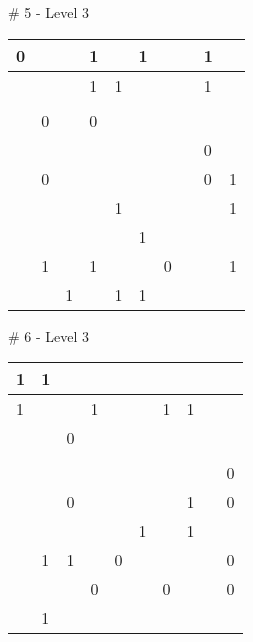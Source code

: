 \medskip

\# 5 - Level 3 \newline
\begin{tabular}{|m{\collen}|m{\collen}|m{\collen}|m{\collen}|m{\collen}|m{\collen}|m{\collen}|m{\collen}|m{\collen}|m{\collen}|}
\hline
  0 &   &   & 1 &   & 1 &   &   & 1 &   \\
\hline
    &   &   & 1 & 1 &   &   &   & 1 &   \\
\hline
    &   &   &   &   &   &   &   &   &   \\
\hline
    & 0 &   & 0 &   &   &   &   &   &   \\
\hline
    &   &   &   &   &   &   &   & 0 &   \\
\hline
    & 0 &   &   &   &   &   &   & 0 & 1 \\
\hline
    &   &   &   & 1 &   &   &   &   & 1 \\
\hline
    &   &   &   &   & 1 &   &   &   &   \\
\hline
    & 1 &   & 1 &   &   & 0 &   &   & 1 \\
\hline
    &   & 1 &   & 1 & 1 &   &   &   &   \\
\hline
\end{tabular}


\medskip

\# 6 - Level 3 \newline
\begin{tabular}{|m{\collen}|m{\collen}|m{\collen}|m{\collen}|m{\collen}|m{\collen}|m{\collen}|m{\collen}|m{\collen}|m{\collen}|}
\hline
  1 & 1 &   &   &   &   &   &   &   &   \\
\hline
  1 &   &   & 1 &   &   & 1 & 1 &   &   \\
\hline
    &   & 0 &   &   &   &   &   &   &   \\
\hline
    &   &   &   &   &   &   &   &   &   \\
\hline
    &   &   &   &   &   &   &   &   & 0 \\
\hline
    &   & 0 &   &   &   &   & 1 &   & 0 \\
\hline
    &   &   &   &   & 1 &   & 1 &   &   \\
\hline
    & 1 & 1 &   & 0 &   &   &   &   & 0 \\
\hline
    &   &   & 0 &   &   & 0 &   &   & 0 \\
\hline
    & 1 &   &   &   &   &   &   &   &   \\
\hline
\end{tabular}


\medskip

